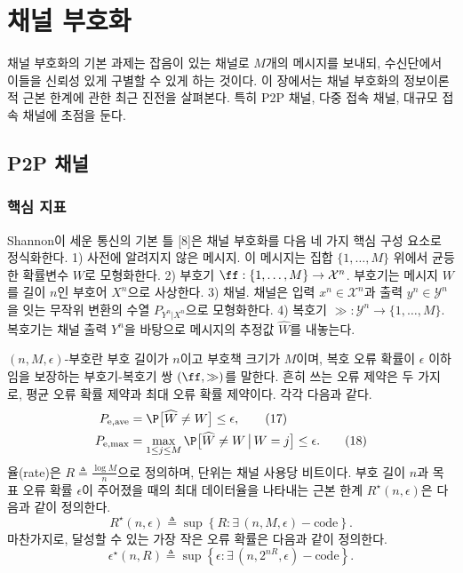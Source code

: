 \section{채널 부호화}

채널 부호화의 기본 과제는 잡음이 있는 채널로 $M$개의 메시지를 보내되, 수신단에서 이들을 신뢰성 있게 구별할 수 있게 하는 것이다. 이 장에서는 채널 부호화의 정보이론적 근본 한계에 관한 최근 진전을 살펴본다. 특히 P2P 채널, 다중 접속 채널, 대규모 접속 채널에 초점을 둔다.

\subsection{P2P 채널}

\subsubsection{핵심 지표}

Shannon이 세운 통신의 기본 틀 [8]은 채널 부호화를 다음 네 가지 핵심 구성 요소로 정식화한다.
1) 사전에 알려지지 않은 메시지. 이 메시지는 집합 $\{1,\dots,M\}$ 위에서 균등한 확률변수 $W$로 모형화한다.
2) 부호기 $\ff:\{1,\dots,M\}\to\mathcal{X}^n$. 부호기는 메시지 $W$를 길이 $n$인 부호어 $X^n$으로 사상한다.
3) 채널. 채널은 입력 $x^n\in\mathcal{X}^n$과 출력 $y^n\in\mathcal{Y}^n$을 잇는 무작위 변환의 수열 $P_{Y^n|X^n}$으로 모형화한다.
4) 복호기 $\gg:\mathcal{Y}^n\to\{1,\dots,M\}$. 복호기는 채널 출력 $Y^n$을 바탕으로 메시지의 추정값 $\widehat{W}$를 내놓는다.

$(n,M,\epsilon)$-부호란 부호 길이가 $n$이고 부호책 크기가 $M$이며, 복호 오류 확률이 $\epsilon$ 이하임을 보장하는 부호기-복호기 쌍 $(\ff,\gg)$를 말한다. 흔히 쓰는 오류 제약은 두 가지로, 평균 오류 확률 제약과 최대 오류 확률 제약이다. 각각 다음과 같다.
\begin{align}
P_{\mathrm{e,ave}} &= \P\bigl[\widehat{W}\neq W\bigr]\le\epsilon, \tag{17}\\
P_{\mathrm{e,max}} &= \max_{1\le j\le M}\P\bigl[\widehat{W}\neq W \,\big|\, W=j\bigr]\le\epsilon. \tag{18}
\end{align}
율(rate)은 $R\triangleq\frac{\log M}{n}$으로 정의하며, 단위는 채널 사용당 비트이다. 부호 길이 $n$과 목표 오류 확률 $\epsilon$이 주어졌을 때의 최대 데이터율을 나타내는 근본 한계 $R^\star(n,\epsilon)$은 다음과 같이 정의한다.
\begin{equation}
R^\star(n,\epsilon)\triangleq\sup\left\{R:\exists\,(n,M,\epsilon)-\text{code}\right\}. \tag{19}
\end{equation}
마찬가지로, 달성할 수 있는 가장 작은 오류 확률은 다음과 같이 정의한다.
\begin{equation}
\epsilon^\star(n,R)\triangleq\sup\left\{\epsilon:\exists\,(n,2^{nR},\epsilon)-\text{code}\right\}. \tag{20}
\end{equation}

